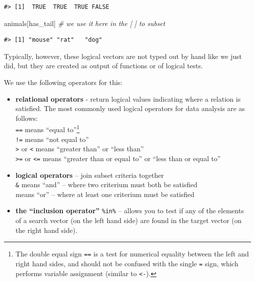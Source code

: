 \documentclass[
]{book}
\newenvironment{Shaded}{\begin{snugshade}}{\end{snugshade}}
\newcommand{\CommentTok}[1]{\textcolor[rgb]{0.56,0.35,0.01}{\textit{#1}}}
\newcommand{\NormalTok}[1]{#1}
\begin{document}
\begin{verbatim}
#> [1]  TRUE  TRUE  TRUE FALSE
\end{verbatim}

\begin{Shaded}
\begin{Highlighting}[]
\NormalTok{animals[has\_tail] }\CommentTok{\# we use it here in the [ ] to subset}
\end{Highlighting}
\end{Shaded}

\begin{verbatim}
#> [1] "mouse" "rat"   "dog"
\end{verbatim}

Typically, however, these logical vectors are not typed out by hand like we just did, but they are created as output of functions or of logical tests.

We use the following operators for this:

\begin{itemize}
\item
  \textbf{relational operators} - return logical values indicating where a relation is satisfied. The most commonly used logical operators for data analysis are as follows:\\
  \texttt{==} means ``equal to''\footnote{The double equal sign \texttt{==} is a test for numerical equality between the left and right hand sides, and should not be confused with the single \texttt{=} sign, which performs variable assignment (similar
    to \texttt{\textless{}-}).}\\
  \texttt{!=} means ``not equal to''\\
  \texttt{\textgreater{}} or \texttt{\textless{}} means ``greater than'' or ``less than''\\
  \texttt{\textgreater{}=} or \texttt{\textless{}=} means ``greater than or equal to'' or ``less than or equal to''
\item
  \textbf{logical operators} -- join subset criteria together\\
  \texttt{\&} means ``and'' -- where two criterium must both be satisfied\\
  \texttt{\textbar{}} means ``or'' -- where at least one criterium must be satisfied
\item
  \textbf{the ``inclusion operator''} \texttt{\%in\%} -- allows you to test if any of the elements of a search vector (on the left hand side) are found in the target vector (on the right hand side).
\end{itemize}
\end{document}
